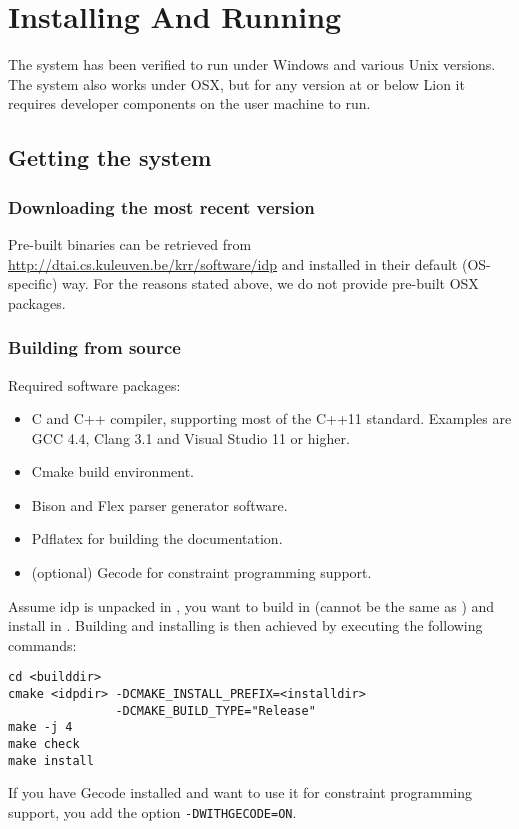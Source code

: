 \section{Installing And Running}
The system has been verified to run under Windows and various Unix versions.
The system also works under OSX, but for any version at or below Lion it requires developer components on the user machine to run.

\subsection{Getting the system}
\subsubsection{Downloading the most recent version}
Pre-built binaries can be retrieved from \url{http://dtai.cs.kuleuven.be/krr/software/idp} and installed in their default (OS-specific) way.
For the reasons stated above, we do not provide pre-built OSX packages. 

\subsubsection{Building from source}
Required software packages:
\begin{itemize}
  \item C and C++ compiler, supporting most of the C++11 standard. Examples are GCC 4.4, Clang 3.1 and Visual Studio 11 or higher.
  \item Cmake build environment. 
  \item Bison and Flex parser generator software.
  \item Pdflatex for building the documentation.
  \item (optional) Gecode for constraint programming support.
\end{itemize}

Assume idp is unpacked in , you want to build in  (cannot be the same as ) and install in . Building and installing is then achieved by executing the following commands:
\begin{lstlisting}
cd <builddir>
cmake <idpdir> -DCMAKE_INSTALL_PREFIX=<installdir> 
               -DCMAKE_BUILD_TYPE="Release"
make -j 4
make check
make install
\end{lstlisting}

If you have Gecode installed and want to use it for constraint programming support, you add the option {\tt -DWITHGECODE=ON}.

